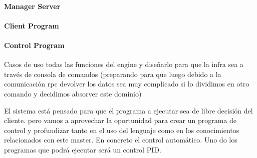 \paragraph{Manager Server}
    
\paragraph{Client Program}
    
\paragraph{Control Program}

Casos de uso todas las funciones del engine y diseñarlo para que la infra sea a través de consola de comandos (preparando para que luego debido a la comunicación rpc devolver los datos sea muy complicado si lo dividimos en otro comando y decidimos absorver este dominio)

El sistema está pensado para que el programa a ejecutar sea de libre decisión del cliente. pero vamos a aprovechar la oportunidad para crear un programa de control y profundizar tanto en el uso del lenguaje como en los conocimientos relacionados con este master. En concreto el control automático. Uno do los programas que podrá ejecutar será un control PID.